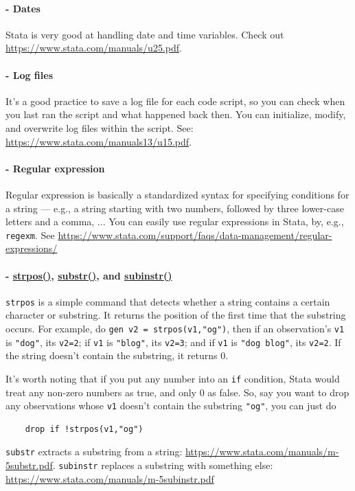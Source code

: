 \paragraph{- Dates} Stata is very good at handling date and time variables. Check out \url{https://www.stata.com/manuals/u25.pdf}. 

\paragraph{- Log files} It's a good practice to save a log file for each code script, so you can check when you last ran the script and what happened back then. You can initialize, modify, and overwrite log files within the script. See: \url{https://www.stata.com/manuals13/u15.pdf}.

\paragraph{- Regular expression} Regular expression is basically a standardized syntax for specifying conditions for a string --- e.g., a string starting with two numbers, followed by three lower-case letters and a comma, ... You can easily use regular expressions in Stata, by, e.g., \verb|regexm|. See \url{https://www.stata.com/support/faqs/data-management/regular-expressions/}

\paragraph{- \underline{strpos()}, \underline{substr()}, and \underline{subinstr()}} \verb|strpos| is a simple command that detects whether a string contains a certain character or substring. It returns the position of the first time that the substring occurs. For example, do \verb|gen v2 = strpos(v1,"og")|, then if an observation's \verb|v1| is \verb|"dog"|, its \verb|v2=2|; if \verb|v1| is \verb|"blog"|, its \verb|v2=3|; and if \verb|v1| is \verb|"dog blog"|, its \verb|v2=2|. If the string doesn't contain the substring, it returns 0. 

It's worth noting that if you put any number into an \verb|if| condition, Stata would treat any non-zero numbers as true, and only 0 as false. So, say you want to drop any observations whose \verb|v1| doesn't contain the substring \verb|"og"|, you can just do 
\begin{verbatim}
    drop if !strpos(v1,"og")
\end{verbatim}

\verb|substr| extracts a substring from a string: \url{https://www.stata.com/manuals/m-5substr.pdf}. \verb|subinstr| replaces a substring with something else: \url{https://www.stata.com/manuals/m-5subinstr.pdf}

